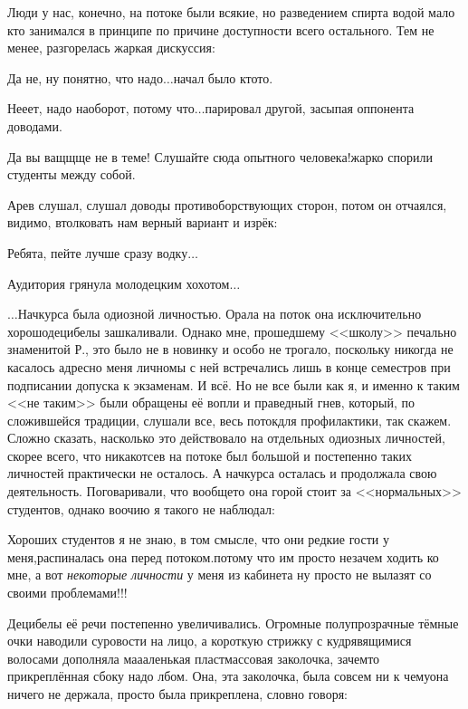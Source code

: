 Люди у нас, конечно, на потоке были всякие, но разведением спирта водой мало кто занимался в принципе по причине доступности всего остального. Тем не менее, разгорелась жаркая дискуссия:

\diagdash Да не, ну понятно, что надо$\ldots$\mdash начал было кто\sdash то.

\diagdash Не\sdash е\sdash ет, надо наоборот, потому что$\ldots$\mdash парировал другой, засыпая оппонента доводами.

\diagdash Да вы ващ\sdash щ\sdash ще не в теме! Слушайте сюда опытного человека!\mdash жарко спорили студенты между собой.

Ар\sdash ев слушал, слушал доводы противоборствующих сторон, потом он отчаялся, видимо, втолковать нам верный вариант и изрёк:

\diagdash Ребята, пейте лучше сразу водку$\ldots$

Аудитория грянула молодецким хохотом$\ldots$

\vspace{1.0cm}

$\ldots$Начкурса была одиозной личностью. Орала на поток она исключительно хорошо\mdash децибелы зашкаливали. Однако мне, прошедшему <<школу>> печально знаменитой Р., это было не в новинку и особо не трогало, поскольку никогда не касалось адресно меня лично\mdash мы с ней встречались лишь в конце семестров при подписании допуска к экзаменам. И всё. Но не все были как я, и именно к таким <<не таким>> были обращены её вопли и праведный гнев, который, по сложившейся традиции, слушали все, весь поток\mdash для профилактики, так скажем. Сложно сказать, насколько это действовало на отдельных одиозных личностей, скорее всего, что никак\mdash отсев на потоке был большой и постепенно таких личностей практически не осталось. А начкурса осталась и продолжала свою деятельность. Поговаривали, что вообще\sdash то она горой стоит за <<нормальных>> студентов, однако воочию я такого не наблюдал:

\diagdash Хороших студентов я не знаю, в том смысле, что они редкие гости у меня,\mdash распиналась она перед потоком.\mdash потому что им просто незачем ходить ко мне, а вот \textit{некоторые личности} у меня из кабинета ну просто не вылазят со своими проблемами!!!

Децибелы её речи постепенно увеличивались. Огромные полупрозрачные тёмные очки наводили суровости на лицо, а короткую стрижку с кудрявящимися волосами дополняла ма\sdash а\sdash аленькая пластмассовая заколочка, зачем\sdash то прикреплённая сбоку надо лбом. Она, эта заколочка, была совсем ни к чему\mdash она ничего не держала, просто была прикреплена, словно говоря:


